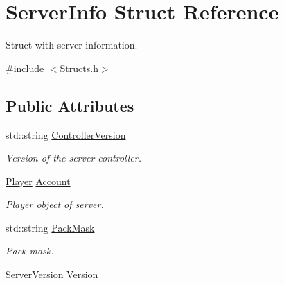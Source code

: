 \hypertarget{structServerInfo}{\section{Server\-Info Struct Reference}
\label{structServerInfo}
}


Struct with server information.  




{\ttfamily \#include $<$Structs.\-h$>$}

\subsection*{Public Attributes}
\begin{DoxyCompactItemize}
\item 
\hypertarget{structServerInfo_af708f8b3545fe87a6c86bbcebf14dc34}{std\-::string \hyperlink{structServerInfo_af708f8b3545fe87a6c86bbcebf14dc34}{Controller\-Version}}\label{structServerInfo_af708f8b3545fe87a6c86bbcebf14dc34}

\begin{DoxyCompactList}\small\item\em Version of the server controller. \end{DoxyCompactList}\item 
\hypertarget{structServerInfo_a4ce1342cad06ef64048b368ce0dec575}{\hyperlink{structPlayer}{Player} \hyperlink{structServerInfo_a4ce1342cad06ef64048b368ce0dec575}{Account}}\label{structServerInfo_a4ce1342cad06ef64048b368ce0dec575}

\begin{DoxyCompactList}\small\item\em \hyperlink{structPlayer}{Player} object of server. \end{DoxyCompactList}\item 
\hypertarget{structServerInfo_a3b31d3c315156f16d54650a99661ed0f}{std\-::string \hyperlink{structServerInfo_a3b31d3c315156f16d54650a99661ed0f}{Pack\-Mask}}\label{structServerInfo_a3b31d3c315156f16d54650a99661ed0f}

\begin{DoxyCompactList}\small\item\em Pack mask. \end{DoxyCompactList}\item 
\hypertarget{structServerInfo_acf8188cc44967ffa44dc23e14dfe0cd7}{\hyperlink{structServerVersion}{Server\-Version} \hyperlink{structServerInfo_acf8188cc44967ffa44dc23e14dfe0cd7}{Version}}\label{structServerInfo_acf8188cc44967ffa44dc23e14dfe0cd7}


\end{DoxyCompactItemize}
